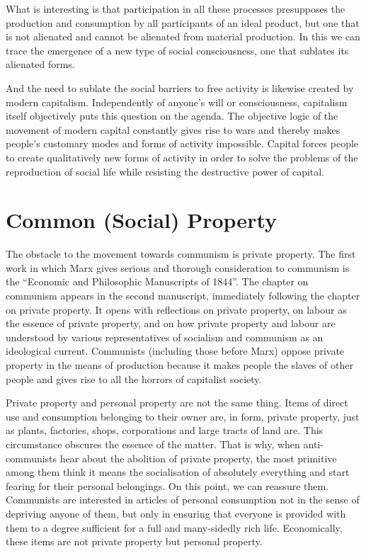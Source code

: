\documentclass[12pt,a4paper,openany]{book}
\begin{document}
What is interesting is that participation in all these processes presupposes the production and consumption by all participants of an ideal product, but one that is not alienated and cannot be alienated from material production. In this we can trace the emergence of a new type of social consciousness, one that sublates its alienated forms.

And the need to sublate the social barriers to free activity is likewise created by modern capitalism. Independently of anyone’s will or consciousness, capitalism itself objectively puts this question on the agenda. The objective logic of the movement of modern capital constantly gives rise to wars and thereby makes people’s customary modes and forms of activity impossible. Capital forces people to create qualitatively new forms of activity in order to solve the problems of the reproduction of social life while resisting the destructive power of capital.
\ifSubfilesClassLoaded{\setcounter{page}{27}}{}
\section{Common (Social) Property}
\label{sec:05_common_property}

The obstacle to the movement towards communism is private property. The first work in which Marx gives serious and thorough consideration to communism is the “Economic and Philosophic Manuscripts of 1844”. The chapter on communism appears in the second manuscript, immediately following the chapter on private property. It opens with reflections on private property, on labour as the essence of private property, and on how private property and labour are understood by various representatives of socialism and communism as an ideological current. Communists (including those before Marx) oppose private property in the means of production because it makes people the slaves of other people and gives rise to all the horrors of capitalist society.

Private property and personal property are not the same thing. Items of direct use and consumption belonging to their owner are, in form, private property, just as plants, factories, shops, corporations and large tracts of land are. This circumstance obscures the essence of the matter. That is why, when anti-communists hear about the abolition of private property, the most primitive among them think it means the socialisation of absolutely everything and start fearing for their personal belongings. On this point, we can reassure them. Communists are interested in articles of personal consumption not in the sense of depriving anyone of them, but only in ensuring that everyone is provided with them to a degree sufficient for a full and many-sidedly rich life. Economically, these items are not private property but personal property.
\end{document}
